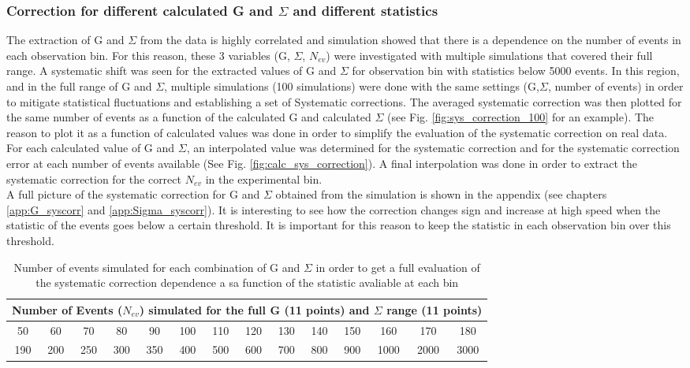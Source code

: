 \subsubsection{Correction for different calculated G and \texorpdfstring{$\Sigma$}{Sigma} and different statistics}
The extraction of G and $\Sigma$ from the data is highly correlated and simulation showed that there is a dependence on the number of events in each observation bin. For this reason, these 3 variables (G, $\Sigma$, $N_{ev}$) were investigated with multiple simulations that covered their full range. A systematic shift was seen for the extracted values of G and $\Sigma$ for observation bin with statistics below 5000 events. In this region, and in the full range of G and $\Sigma$, multiple simulations (100 simulations) were done with the same settings (G,$\Sigma$, number of events) in order to mitigate statistical fluctuations and establishing a set of Systematic corrections. The averaged systematic correction was then plotted for the same number of events as a function of the calculated G and calculated $\Sigma$ (see Fig. \ref{fig:sys_correction_100} for an example). The reason to plot it as a function of calculated values was done in order to simplify the evaluation of the systematic correction on real data. For each calculated value of G and $\Sigma$, an interpolated value was determined for the systematic correction and for the systematic correction error at each number of events available (See Fig. \ref{fig:calc_sys_correction}). A final interpolation was done in order to extract the systematic correction for the correct $N_{ev}$ in the experimental bin. \\
A full picture of the systematic correction for G and $\Sigma$ obtained from the simulation is shown in the appendix (see chapters \ref{app:G_syscorr} and \ref{app:Sigma_syscorr}). It is interesting to see how the correction changes sign and increase at high speed when the statistic of the events goes below a certain threshold. It is important for this reason to keep the statistic in each observation bin over this threshold.
\begin{table}
  \begin{center}
    \begin{tabular}{ ||c|c|c|c|c|c|c|c|c|c|c|c|c|c||}
      \hline
      \multicolumn{14}{|c|}{Number of Events ($N_{ev}$) simulated for the full G (11 points) and $\Sigma$ range (11 points)  } \\
      \hline
      \hline
      50&60&70&80&90&100&110&120&130&140&150&160&170&180\\
      \hline
      190&200&250&300&350&400&500&600&700&800&900&1000&2000&3000 \\
      \hline
    \end{tabular}
  \end{center}
  \caption{Number of events simulated for each combination of G and $\Sigma$ in order to get a full evaluation of the systematic correction dependence a sa function of the statistic avaliable at each bin}
  \label{table:sim_nevents}
\end{table}


